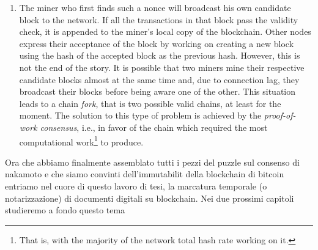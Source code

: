 \begin{enumerate}
    \begin{mydef}{\bf (Bitcoin proof-of-work)}.
        \label{def:btc-pow}
        The Bitcoin proof-of-work consists of finding a special number $x$ called nonce s.t. the double SHA256 of the candidate block header falls below a given threshold\textup{\footnote{More precisely, the difficulty $d$ is calculated as: $d=\frac{\text{difficulty\_1\_target}}{\text{current\_target}}$. Traditionally, the \textit{difficulty\_1\_target} represents a hash where the leading 32 bits are zero and the rest are one, known as \textit{pool difficulty}, or \textit{pdiff}. Thus, the threshold value appears as $\frac{2^{224}}{d}$ and not $\frac{2^{256}}{d}$. In addition, the mining threshold is adaptively adjusted every 2016 blocks to achieve an average goal of a block 10 minutes (i.e. every 2 weeks).}}:
        $$F_{d}(c,x) \rightarrow \text{SHA256}(\text{SHA256}(\underbrace{... \| \text{prev\_block\_header\_hash} \| ... \| x}_{\text{Candidate Block Header}})) < \frac{2^{224}}{d}$$
    \end{mydef}
    
    \item The miner who first finds such a nonce will broadcast his own candidate block to the network. If all the transactions in that block pass the validity check, it is appended to the miner's local copy of the blockchain. Other nodes express their acceptance of the block by working on creating a new block using the hash of the accepted block as the previous hash. However, this is not the end of the story. It is possible that two miners mine their respective candidate blocks almost at the same time and, due to connection lag, they broadcast their blocks before being aware one of the other. This situation leads to a chain \textit{fork}, that is two possible valid chains, at least for the moment. The solution to this type of problem is achieved by the \textit{proof-of-work consensus}, i.e., in favor of the chain which required the most computational work\footnote{That is, with the majority of the network total hash rate working on it.} to produce.

\end{enumerate}

\bigskip
\noindent
Ora che abbiamo finalmente assemblato tutti i pezzi del puzzle sul consenso di nakamoto e che siamo convinti dell'immutabilit della blockchain di bitcoin entriamo nel cuore di questo lavoro di tesi, la marcatura temporale (o notarizzazione) di documenti digitali su blockchain. Nei due prossimi capitoli studieremo a fondo questo tema 

